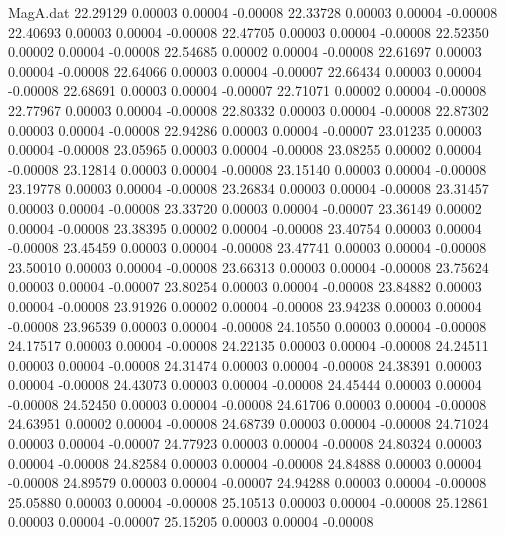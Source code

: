 \begin{filecontents}{MagA.dat}
  22.29129    0.00003    0.00004   -0.00008
  22.33728    0.00003    0.00004   -0.00008
  22.40693    0.00003    0.00004   -0.00008
  22.47705    0.00003    0.00004   -0.00008
  22.52350    0.00002    0.00004   -0.00008
  22.54685    0.00002    0.00004   -0.00008
  22.61697    0.00003    0.00004   -0.00008
  22.64066    0.00003    0.00004   -0.00007
  22.66434    0.00003    0.00004   -0.00008
  22.68691    0.00003    0.00004   -0.00007
  22.71071    0.00002    0.00004   -0.00008
  22.77967    0.00003    0.00004   -0.00008
  22.80332    0.00003    0.00004   -0.00008
  22.87302    0.00003    0.00004   -0.00008
  22.94286    0.00003    0.00004   -0.00007
  23.01235    0.00003    0.00004   -0.00008
  23.05965    0.00003    0.00004   -0.00008
  23.08255    0.00002    0.00004   -0.00008
  23.12814    0.00003    0.00004   -0.00008
  23.15140    0.00003    0.00004   -0.00008
  23.19778    0.00003    0.00004   -0.00008
  23.26834    0.00003    0.00004   -0.00008
  23.31457    0.00003    0.00004   -0.00008
  23.33720    0.00003    0.00004   -0.00007
  23.36149    0.00002    0.00004   -0.00008
  23.38395    0.00002    0.00004   -0.00008
  23.40754    0.00003    0.00004   -0.00008
  23.45459    0.00003    0.00004   -0.00008
  23.47741    0.00003    0.00004   -0.00008
  23.50010    0.00003    0.00004   -0.00008
  23.66313    0.00003    0.00004   -0.00008
  23.75624    0.00003    0.00004   -0.00007
  23.80254    0.00003    0.00004   -0.00008
  23.84882    0.00003    0.00004   -0.00008
  23.91926    0.00002    0.00004   -0.00008
  23.94238    0.00003    0.00004   -0.00008
  23.96539    0.00003    0.00004   -0.00008
  24.10550    0.00003    0.00004   -0.00008
  24.17517    0.00003    0.00004   -0.00008
  24.22135    0.00003    0.00004   -0.00008
  24.24511    0.00003    0.00004   -0.00008
  24.31474    0.00003    0.00004   -0.00008
  24.38391    0.00003    0.00004   -0.00008
  24.43073    0.00003    0.00004   -0.00008
  24.45444    0.00003    0.00004   -0.00008
  24.52450    0.00003    0.00004   -0.00008
  24.61706    0.00003    0.00004   -0.00008
  24.63951    0.00002    0.00004   -0.00008
  24.68739    0.00003    0.00004   -0.00008
  24.71024    0.00003    0.00004   -0.00007
  24.77923    0.00003    0.00004   -0.00008
  24.80324    0.00003    0.00004   -0.00008
  24.82584    0.00003    0.00004   -0.00008
  24.84888    0.00003    0.00004   -0.00008
  24.89579    0.00003    0.00004   -0.00007
  24.94288    0.00003    0.00004   -0.00008
  25.05880    0.00003    0.00004   -0.00008
  25.10513    0.00003    0.00004   -0.00008
  25.12861    0.00003    0.00004   -0.00007
  25.15205    0.00003    0.00004   -0.00008

\end{filecontents}
